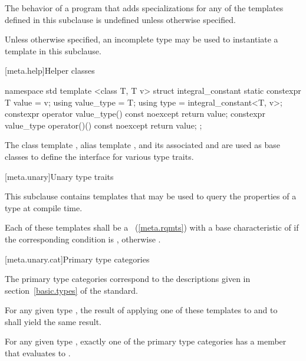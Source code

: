 \pnum
The behavior of a program that adds specializations for any of
the templates defined in this subclause is undefined unless otherwise specified.

\pnum
Unless otherwise specified, an incomplete type may be used
to instantiate a template in this subclause.

[meta.help]{Helper classes}

\begin{codeblock}
namespace std {
  template <class T, T v>
  struct integral_constant {
    static constexpr T value = v;
    using value_type = T;
    using type       = integral_constant<T, v>;
    constexpr operator value_type() const noexcept { return value; }
    constexpr value_type operator()() const noexcept { return value; }
  };
}
\end{codeblock}

%
%
%
%
\pnum
The class template ,
alias template , and
its associated 
 and 
are used as base classes to define
the interface for various type traits.

[meta.unary]{Unary type traits}

\pnum
This subclause contains templates that may be used to query the
properties of a type at compile time.

\pnum
Each of these templates shall be a
~(\ref{meta.rqmts})
with a base characteristic of
 if the corresponding condition is , otherwise
.

[meta.unary.cat]{Primary type categories}

\pnum
The primary type categories correspond to the descriptions given in
section~\ref{basic.types} of the \Cpp standard.

\pnum
For any given type , the result of applying one of these templates to
 and to \cv{}~ shall yield the same result.

\pnum
\begin{note}
For any given type , exactly one of the primary type categories
has a  member that evaluates to .
\end{note}

